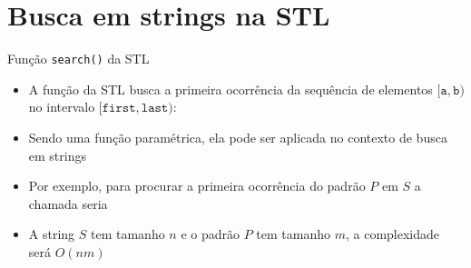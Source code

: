 \section{Busca em strings na STL}

\begin{frame}[fragile]{Função {\tt search()} da STL}

    \begin{itemize}
        \item A função  da STL busca a primeira ocorrência da sequência de
            elementos $[\mathtt{a}, \mathtt{b})$ no intervalo $[\mathtt{first},\mathtt{last})$:

            \vspace{.1in}
            \vspace{.1in}
        \pause

        \item Sendo uma função paramétrica, ela pode ser aplicada no contexto de busca em
            strings
        \pause

        \item Por exemplo, para procurar a primeira ocorrência do padrão $P$ em $S$ a chamada
            seria

            \vspace{.1in}
            \vspace{.1in}
        \pause

        \item A string $S$ tem tamanho $n$ e o padrão $P$ tem tamanho $m$, a complexidade será
            $O(nm)$

    \end{itemize}

\end{frame}

